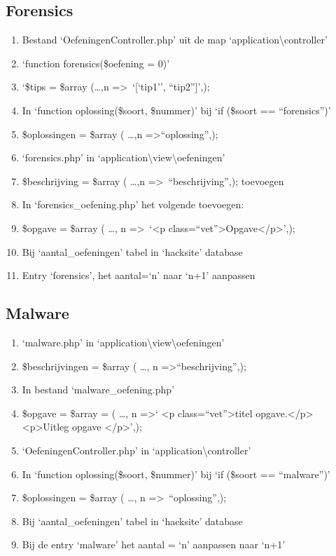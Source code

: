 \subsection{Forensics} 
\begin{enumerate}
\item Bestand `OefeningenController.php' uit de map `application\textbackslash controller'
\item `function forensics(\$oefening = 0)'
\item `\$tips = \$array (\ldots ,n =\textgreater ~`[`tip1'', ``tip2'']',);
\item In `function oplossing(\$soort, \$nummer)' bij `if (\$soort == ``forensics'')'
\item \$oplossingen = \$array ( \ldots ,n =\textgreater ``oplossing'',);
\item `forensics.php' in `application\textbackslash view\textbackslash oefeningen'
\item \$beschrijving = \$array ( \ldots ,n =\textgreater ~``beschrijving'',); toevoegen
\item  In `forensics\_oefening.php' het volgende toevoegen:
\item \$opgave = \$array ( \ldots , n =\textgreater ~`\textless p class=``vet''\textgreater Opgave\textless /p\textgreater',);
\item Bij `aantal\_oefeningen' tabel in `hacksite' database
\item Entry `forensics', het aantal=`n' naar `n+1' aanpassen
\end{enumerate}

\subsection{Malware} 
\begin{enumerate}
\item `malware.php' in `application\textbackslash view\textbackslash oefeningen'
\item \$beschrijvingen = \$array ( \ldots , n =\textgreater ``beschrijving'',);
\item In bestand `malware\_oefening.php'
\item \$opgave = \$array = ( \ldots , n =\textgreater ` \textless p class=``vet''\textgreater titel opgave.\textless /p\textgreater \textless p\textgreater Uitleg opgave \textless /p\textgreater',);
\item `OefeningenController.php' in `application\textbackslash controller'
\item In `function oplossing(\$soort, \$nummer)' bij `if (\$soort == ``malware'')'
\item \$oplossingen = \$array ( \ldots , n =\textgreater ~``oplossing'',);
\item Bij `aantal\_oefeningen' tabel in `hacksite' database
\item Bij de entry `malware' het aantal = `n' aanpassen naar `n+1'
\end{enumerate}

